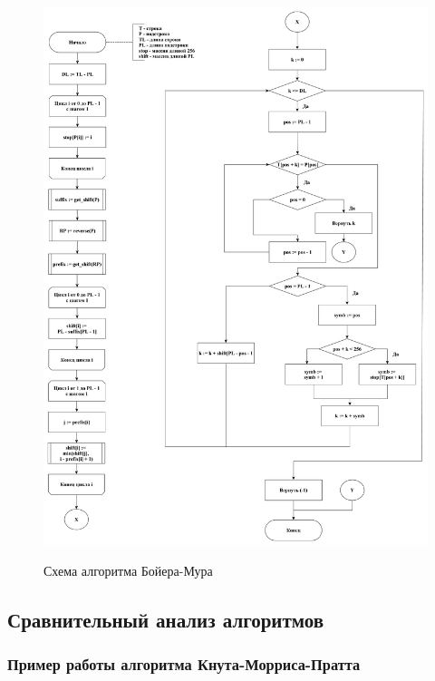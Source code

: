 \documentclass[a4paper,12pt]{article}
\begin{document}
\pagebreak

\begin{figure}[h!]
\begin{center}
{\includegraphics[scale = 0.35]{diagram/bm.pdf}}
\caption{
Схема алгоритма Бойера-Мура}
\label{fig:bm}
\end{center}
\end{figure}

\pagebreak

\subsection{Сравнительный анализ алгоритмов}
\label{fig:cmp_section}

\subsubsection{Пример работы алгоритма Кнута-Морриса-Пратта}
\end{document}
